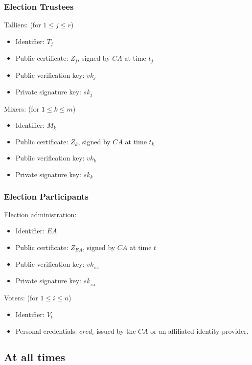 \documentclass[bibtotoc,halfparskip,oneside]{scrreprt}
\newcommand{\cred}[1]{cred_{#1}\xspace}
\newcommand{\sk}[1]{\mathit{sk}_{#1}\xspace}
\newcommand{\vk}[1]{\mathit{vk}_{#1}\xspace}
\newcommand{\SK}[1]{\sk{_#1}\xspace}
\newcommand{\VK}[1]{\vk{_#1}\xspace}
\newcommand{\CA}{\ensuremath{\mathit{CA}}\xspace}
\newcommand{\EA}{\ensuremath{\mathit{EA}}\xspace}
\newcommand{\Tallier}[1]{\ensuremath{\mathit{T}_{#1}}\xspace}
\newcommand{\Mixer}[1]{\ensuremath{\mathit{M}_{#1}}\xspace}
\newcommand{\Voter}[1]{\ensuremath{\mathit{V}_{#1}}\xspace}
\begin{document}
\subsubsection{Election Trustees}

Talliers: (for $1\leq j\leq r$)
\begin{itemize}
	\item Identifier: $\Tallier{j}$
	\item Public certificate: $Z_{j}$, signed by \CA at time $t_j$
	\item Public verification key: $\vk{j}$ 
	\item Private signature key: $\sk{j}$
\end{itemize}

Mixers: (for $1\leq k\leq m$)
\begin{itemize}
	\item Identifier: $\Mixer{k}$
	\item Public certificate: $Z_{k}$, signed by \CA at time $t_k$
	\item Public verification key: $\vk{k}$ 
	\item Private signature key: $\sk{k}$
\end{itemize}

\subsubsection{Election Participants}

Election administration:
\begin{itemize}
	\item Identifier: \EA
	\item Public certificate: $Z_{\EA}$, signed by \CA at time $t$
	\item Public verification key: $\VK{\EA}$ 
	\item Private signature key: $\SK{\EA}$
\end{itemize}

Voters: (for $1\leq i\leq n$)
\begin{itemize}
	\item Identifier: $\Voter{i}$
	\item Personal credentials: $\cred{i}$ issued by the \CA or an affiliated identity provider.
\end{itemize}

\subsection{At all times}\label{Atalltimes}
\end{document}
